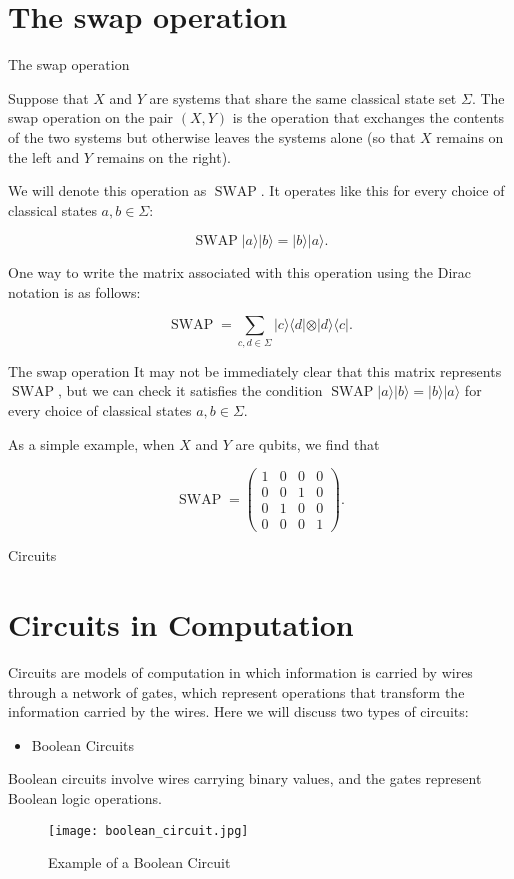 \documentclass[12pt, aspectratio=169]{beamer}
\begin{document}
\section{The swap operation}
\begin{frame}{The swap operation}

Suppose that \(X\) and \(Y\) are systems that share the same classical state set \(\Sigma\). The swap operation on the pair \((X,Y)\) is the operation that exchanges the contents of the two systems but otherwise leaves the systems alone (so that \(X\) remains on the left and \(Y\) remains on the right).

We will denote this operation as \(\operatorname{SWAP}\). It operates like this for every choice of classical states \(a,b\in\Sigma\):

\[
\operatorname{SWAP} \vert a \rangle \vert b \rangle = \vert b \rangle \vert a \rangle.
\]

One way to write the matrix associated with this operation using the Dirac notation is as follows:

\[
\operatorname{SWAP} = \sum_{c,d\in\Sigma} \vert c \rangle \langle d \vert \otimes \vert d \rangle \langle c \vert.
\]
\end{frame}
\begin{frame}{The swap operation}
It may not be immediately clear that this matrix represents \(\operatorname{SWAP}\), but we can check it satisfies the condition \(\operatorname{SWAP} \vert a \rangle \vert b \rangle = \vert b \rangle \vert a \rangle\) for every choice of classical states \(a,b\in\Sigma\).

As a simple example, when \(X\) and \(Y\) are qubits, we find that

\[
\operatorname{SWAP} = \begin{pmatrix} 1 & 0 & 0 & 0\\ 0 & 0 & 1 & 0\\ 0 & 1 & 0 & 0\\ 0 & 0 & 0 & 1 \end{pmatrix}.
\]



\end{frame}
\begin{frame}{Circuits}


\section*{Circuits in Computation}

Circuits are models of computation in which information is carried by wires through a network of gates, which represent operations that transform the information carried by the wires. Here we will discuss two types of circuits:
\begin{itemize}
  \item{ Boolean Circuits}
\end{itemize}
Boolean circuits involve wires carrying binary values, and the gates represent Boolean logic operations.
\begin{figure}[h]
    \centering
    \texttt{[image: boolean\_circuit.jpg]}
    \caption{Example of a Boolean Circuit}
    \label{fig:boolean_circuit}
\end{figure}
\end{frame}
\end{document}
